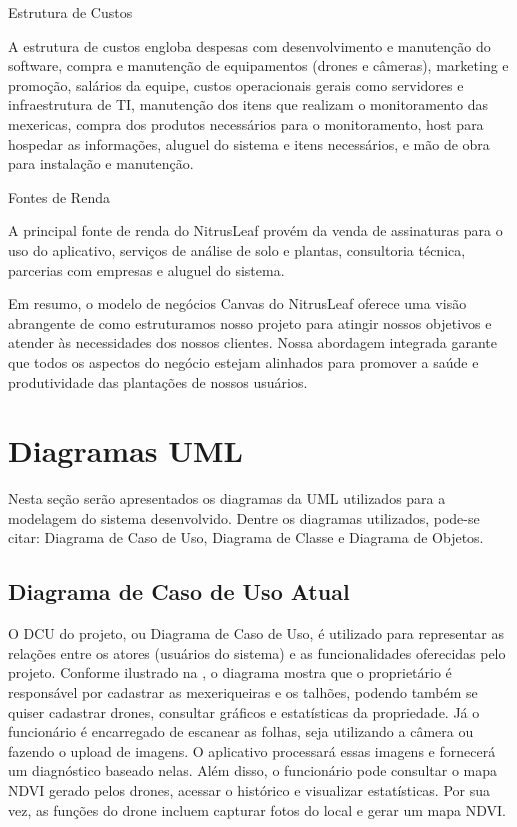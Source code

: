 \documentclass[
  a4paper,%
  12pt,%
  english,%
  brazilian,%
]{article}
\begin{document}
Estrutura de Custos

A estrutura de custos engloba despesas com desenvolvimento e manutenção do software, compra e manutenção de equipamentos (drones e câmeras), marketing e promoção, salários da equipe, custos operacionais gerais como servidores e infraestrutura de TI, manutenção dos itens que realizam o monitoramento das mexericas, compra dos produtos necessários para o monitoramento, host para hospedar as informações, aluguel do sistema e itens necessários, e mão de obra para instalação e manutenção.

Fontes de Renda

A principal fonte de renda do NitrusLeaf provém da venda de assinaturas para o uso do aplicativo, serviços de análise de solo e plantas, consultoria técnica, parcerias com empresas e aluguel do sistema.

Em resumo, o modelo de negócios Canvas do NitrusLeaf oferece uma visão abrangente de como estruturamos nosso projeto para atingir nossos objetivos e atender às necessidades dos nossos clientes. Nossa abordagem integrada garante que todos os aspectos do negócio estejam alinhados para promover a saúde e produtividade das plantações de nossos usuários.
\centering
\section*{Diagramas UML}
    Nesta seção serão apresentados os diagramas da UML utilizados para a modelagem do sistema desenvolvido. Dentre os diagramas utilizados, pode-se citar: Diagrama de Caso de Uso, Diagrama de Classe e Diagrama de Objetos.
    
    \subsection*{Diagrama de Caso de Uso Atual}

    O DCU do projeto, ou Diagrama de Caso de Uso, é utilizado para representar as relações entre os atores (usuários do sistema) e as funcionalidades oferecidas pelo projeto. Conforme ilustrado na , o diagrama mostra que o proprietário é responsável por cadastrar as mexeriqueiras e os talhões, podendo também se quiser cadastrar drones, consultar gráficos e estatísticas da propriedade. Já o funcionário é encarregado de escanear as folhas, seja utilizando a câmera ou fazendo o upload de imagens. O aplicativo processará essas imagens e fornecerá um diagnóstico baseado nelas. Além disso, o funcionário pode consultar o mapa NDVI gerado pelos drones, acessar o histórico e visualizar estatísticas. Por sua vez, as funções do drone incluem capturar fotos do local e gerar um mapa NDVI.
\end{document}
